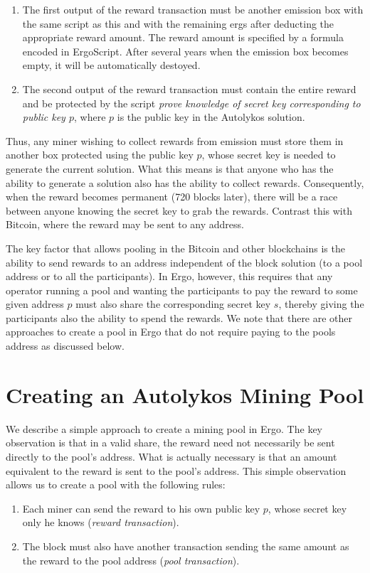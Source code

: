 \documentclass[runningheads]{llncs}
\newcommand{\langname}{ErgoScript\xspace}
\newcommand{\powname}{Autolykos\xspace}
\begin{document}
\begin{enumerate}
	\item The first output of the reward transaction must be another emission box with the same script as this and with the remaining ergs after deducting the appropriate reward amount. The reward amount is specified by a formula encoded in \langname. 
	After several years when the emission box becomes empty, it will be automatically destoyed.
	\item The second output of the reward transaction must contain the entire reward and be protected by the script {\em prove knowledge of secret key corresponding to public key $p$}, where $p$ is the public key in the \powname solution.  
\end{enumerate}

Thus, any miner wishing to collect rewards from emission must store them in another box protected using the public key $p$, whose secret key is needed to generate the current solution. What this means is that anyone who has the ability to generate a solution also has the ability to collect rewards. Consequently, when the reward becomes permanent (720 blocks later), there will be a race between anyone knowing the secret key to grab the rewards. Contrast this with Bitcoin, where the reward may be sent to any address. 

The key factor that allows pooling in the Bitcoin and other blockchains is the ability to send rewards to an address independent of the block solution (to a pool address or to all the participants). In Ergo, however, this requires that any operator running a pool and wanting the participants to pay the reward to some given address $p$ must also share the corresponding secret key $s$, thereby giving the participants also the ability to spend the rewards.
We note that there are other approaches to create a pool in Ergo that do not require paying to the pools address as discussed below.


\section{Creating an \powname Mining Pool}

We describe a simple approach to create a mining pool in Ergo. The key observation is that in a valid share, the reward need not necessarily be sent directly to the pool's address. What is actually necessary is that an amount equivalent to the reward is sent to the pool's address. This simple observation allows us to create a pool with the following rules:
\begin{enumerate}
	\item Each miner can send the reward to his own public key $p$, whose secret key only he knows ({\em reward transaction}).
	\item The block must also have another transaction sending the same amount as the reward to the pool address ({\em pool transaction}).
\end{enumerate}
\end{document}
